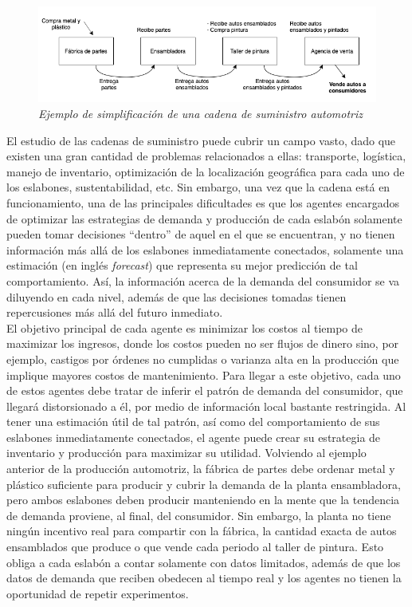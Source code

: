 \begin{figure}[ht]
\caption{\textit{Ejemplo de simplificaci\'on de una cadena de suministro automotriz}}
\label{automotriz}
\includegraphics[width=15cm]{tesis_tex/figs/auto_chain_simple.png}
\centering
\end{figure}


El estudio de las cadenas de suministro puede cubrir un campo vasto, dado que existen una gran cantidad de problemas relacionados a ellas: transporte, log\'istica, manejo de inventario, optimizaci\'on de la localizaci\'on geogr\'afica para cada uno de los eslabones, sustentabilidad, etc. Sin embargo, una vez que la cadena est\'a en funcionamiento, una de las principales dificultades es que los agentes encargados de optimizar las estrategias de demanda y producci\'on de cada eslab\'on solamente pueden tomar decisiones ``dentro'' de aquel en el que se encuentran, y no tienen informaci\'on m\'as all\'a de los eslabones inmediatamente conectados, solamente una estimaci\'on (en ingl\'es \textit{forecast}) que representa su mejor predicci\'on de tal comportamiento. As\'i, la informaci\'on acerca de la demanda del consumidor se va diluyendo en cada nivel, además de que las decisiones tomadas tienen repercusiones m\'as all\'a del futuro inmediato. \\

El objetivo principal de cada agente es minimizar los costos al tiempo de maximizar los ingresos, donde los costos pueden no ser flujos de dinero sino, por ejemplo, castigos por \'ordenes no cumplidas o varianza alta en la producci\'on que implique mayores costos de mantenimiento. Para llegar a este objetivo, cada uno de estos agentes debe tratar de inferir el patr\'on de demanda del consumidor, que llegar\'a distorsionado a \'el, por medio de información local bastante restringida. Al tener una estimaci\'on \'util de tal patr\'on, as\'i como del comportamiento de sus eslabones inmediatamente conectados, el agente puede crear su estrategia de inventario y producci\'on para maximizar su utilidad. Volviendo al ejemplo anterior de la producci\'on automotriz, la f\'abrica de partes debe ordenar metal y pl\'astico suficiente para producir y cubrir la demanda de la planta ensambladora, pero ambos eslabones deben producir manteniendo en la mente que la tendencia de demanda proviene, al final, del consumidor. Sin embargo, la planta no tiene ning\'un incentivo real para compartir con la f\'abrica, la cantidad exacta de autos ensamblados que produce o que vende cada periodo al taller de pintura. Esto obliga a cada eslab\'on a contar solamente con datos limitados, adem\'as de que los datos de demanda que reciben obedecen al tiempo real y los agentes no tienen la oportunidad de repetir experimentos.\\

